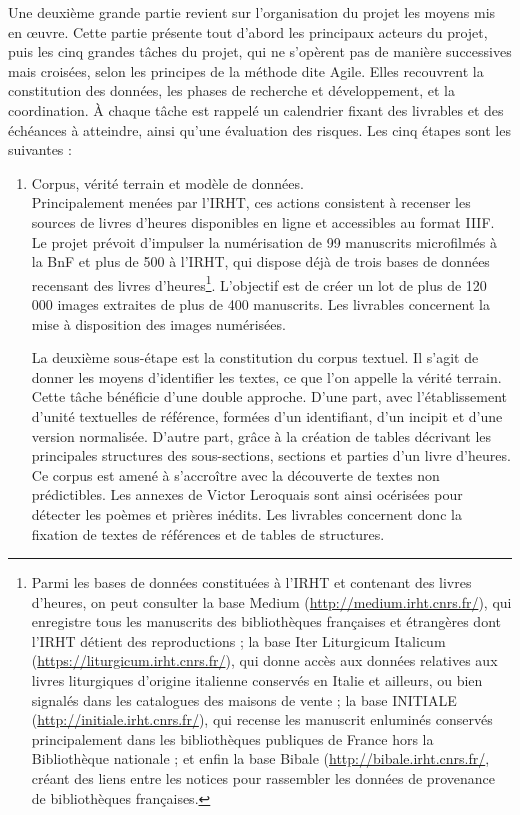 \documentclass[a4paper,12pt,twoside]{book}
\begin{document}
	Une deuxième grande partie revient sur l'organisation du projet les moyens mis en œuvre. Cette partie présente tout d'abord les principaux acteurs du projet, puis les cinq grandes tâches du projet, qui ne s'opèrent pas de manière successives mais croisées, selon les principes de la méthode dite \og Agile\fg{}. Elles recouvrent la constitution des données, les phases de recherche et développement, et la coordination.  À chaque tâche est rappelé un calendrier fixant des livrables et des échéances à atteindre, ainsi qu'une évaluation des risques. Les cinq étapes sont les suivantes : 
	\begin{enumerate}
	    \item \og Corpus, vérité terrain et modèle de données\fg{}. \\
	    
	    Principalement menées par l'IRHT, ces actions consistent à recenser les sources de livres d'heures disponibles en ligne et accessibles au format IIIF. Le projet prévoit d'impulser la numérisation de 99 manuscrits microfilmés à la BnF et plus de 500 à l'IRHT, qui dispose déjà de trois bases de données recensant des livres d'heures\footnote{Parmi les bases de données constituées à l'IRHT et contenant des livres d'heures, on peut consulter la base Medium (\url{http://medium.irht.cnrs.fr/}), qui enregistre tous les manuscrits des bibliothèques françaises et étrangères dont l’IRHT détient des reproductions ; la base Iter Liturgicum Italicum (\url{https://liturgicum.irht.cnrs.fr/}), qui donne accès aux données relatives aux livres liturgiques d’origine italienne conservés en Italie et ailleurs, ou bien signalés dans les catalogues des maisons de vente ; la base INITIALE (\url{http://initiale.irht.cnrs.fr/}), qui recense les manuscrit enluminés conservés principalement dans les bibliothèques publiques de France hors la Bibliothèque nationale ; et enfin la base Bibale (\url{http://bibale.irht.cnrs.fr/}, créant des liens entre les notices pour rassembler les données de provenance de bibliothèques françaises.}. L'objectif est de créer un lot de plus de 120 000 images extraites de plus de 400 manuscrits. Les livrables concernent la mise à disposition des images numérisées.
	    
	    La deuxième sous-étape est la constitution du corpus textuel. Il s'agit de donner les moyens d'identifier les textes, ce que l'on appelle la \og vérité terrain\fg{}. Cette tâche bénéficie d'une double approche. D'une part, avec l'établissement d'unité textuelles de référence, formées d'un identifiant, d'un incipit et d'une version normalisée. D'autre part, grâce à la création de tables décrivant les principales structures des sous-sections, sections et parties d'un livre d'heures. Ce corpus est amené à s'accroître  avec la découverte de textes non prédictibles. Les  annexes de Victor Leroquais sont ainsi océrisées pour détecter les poèmes et prières inédits. Les livrables concernent donc la fixation de textes de références et de tables de structures. 
	    

\end{enumerate}
\end{document}
